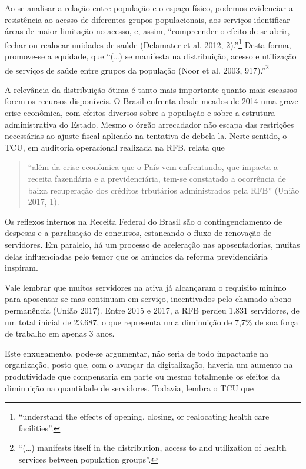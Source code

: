 \documentclass[]{article}
\let\rmarkdownfootnote\footnote%
\def\footnote{\protect\rmarkdownfootnote}
\begin{document}
Ao se analisar a relação entre população e o espaço físico, podemos
evidenciar a resistência ao acesso de diferentes grupos populacionais,
aos serviços identificar áreas de maior limitação no acesso, e, assim,
``compreender o efeito de se abrir, fechar ou realocar unidades de saúde
(Delamater et al. 2012, 2).''\footnote{``understand the effects of
  opening, closing, or realocating health care facilities''.} Desta
forma, promove-se a equidade, que ``(\ldots{}) se manifesta na
distribuição, acesso e utilização de serviços de saúde entre grupos da
população (Noor et al. 2003, 917).''\footnote{``(\ldots{}) manifests
  itself in the distribution, access to and utilization of health
  services between population groups''.}

A relevância da distribuição ótima é tanto mais importante quanto mais
escassos forem os recursos disponíveis. O Brasil enfrenta desde meados
de 2014 uma grave crise econômica, com efeitos diversos sobre a
população e sobre a estrutura administrativa do Estado. Mesmo o órgão
arrecadador não escapa das restrições necessárias ao ajuste fiscal
aplicado na tentativa de debela-la. Neste sentido, o TCU, em auditoria
operacional realizada na RFB, relata que

\begin{quote}
``além da crise econômica que o País vem enfrentando, que impacta a
receita fazendária e a previdenciária, tem-se constatado a ocorrência de
baixa recuperação dos créditos trbutários administrados pela RFB''
(União 2017, 1).
\end{quote}

Os reflexos internos na Receita Federal do Brasil são o
contingenciamento de despesas e a paralisação de concursos, estancando o
fluxo de renovação de servidores. Em paralelo, há um processo de
aceleração nas aposentadorias, muitas delas influenciadas pelo temor que
os anúncios da reforma previdenciária inspiram.

Vale lembrar que muitos servidores na ativa já alcançaram o requisito
mínimo para aposentar-se mas continuam em serviço, incentivados pelo
chamado abono permanência (União 2017). Entre 2015 e 2017, a RFB perdeu
1.831 servidores, de um total inicial de 23.687, o que representa uma
diminuição de 7,7\% de sua força de trabalho em apenas 3 anos.

Este enxugamento, pode-se argumentar, não seria de todo impactante na
organização, posto que, com o avançar da digitalização, haveria um
aumento na produtividade que compensaria em parte ou mesmo totalmente os
efeitos da diminuição na quantidade de servidores. Todavia, lembra o TCU
que
\end{document}
